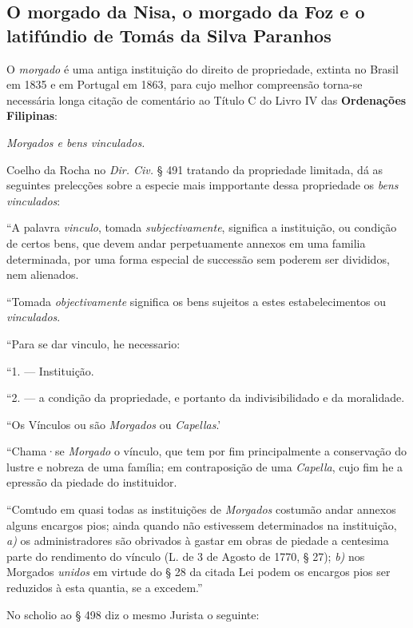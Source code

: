 \subsection{O morgado da Nisa, o morgado da Foz e o latifúndio de Tomás da Silva Paranhos}\label{subsec:nisa}

O \textit{morgado} é uma antiga instituição do direito de propriedade, extinta no Brasil em 1835 e em Portugal em 1863, para cujo melhor compreensão torna-se necessária longa citação de comentário ao Título C do Livro IV das \textbf{Ordenações Filipinas}: 

\begin{citacao}
\textit{Morgados e bens vinculados.}

Coelho da Rocha no \textit{Dir. Civ.} § 491 tratando da propriedade limitada, dá as seguintes prelecções sobre a especie mais impportante dessa propriedade os \textit{bens vinculados}:

``A palavra \textit{vinculo}, tomada \textit{subjectivamente}, significa a instituição, ou condição de certos bens, que devem andar perpetuamente annexos em uma familia determinada, por uma forma especial de successão sem poderem ser divididos, nem alienados.

``Tomada \textit{objectivamente} significa os bens sujeitos a estes estabelecimentos ou \textit{vinculados}.

``Para se dar vinculo, he necessario:

``1. --- Instituição.

``2. --- a condição da propriedade, e portanto da indivisibilidado e da moralidade.

``Os Vínculos ou são \textit{Morgados} ou \textit{Capellas}.'

``Chama·se \textit{Morgado} o vínculo, que tem por fim principalmente a conservação do lustre e nobreza de uma família; em contraposição de uma \textit{Capella}, cujo fim he a epressão da piedade do instituidor.

``Comtudo em quasi todas as instituições de \textit{Morgados} costumão andar annexos alguns encargos pios; ainda quando não estivessem determinados na instituição, \textit{a)} os administradores são obrivados à gastar em obras de piedade a centesima parte do rendimento do vínculo (L. de 3 de Agosto de 1770, § 27); \textit{b)} nos Morgados \textit{unidos} em virtude do § 28 da citada Lei podem os encargos pios ser reduzidos à esta quantia, se a excedem.''

No scholio ao § 498 diz o mesmo Jurista o seguinte:


\end{citacao}
